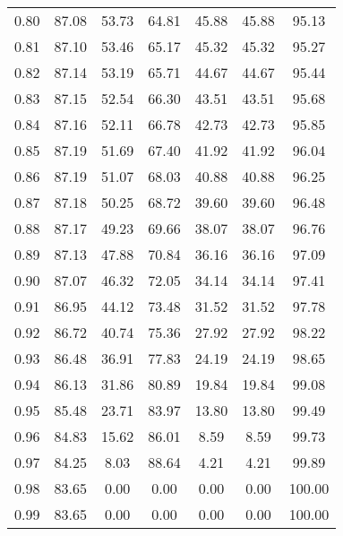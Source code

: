 \begin{tabular}{|c|c|c|c|c|c|c|}
      0.80 &     87.08 &     53.73 &      64.81 &   45.88 &      45.88 &         95.13 \\
      0.81 &     87.10 &     53.46 &      65.17 &   45.32 &      45.32 &         95.27 \\
      0.82 &     87.14 &     53.19 &      65.71 &   44.67 &      44.67 &         95.44 \\
      0.83 &     87.15 &     52.54 &      66.30 &   43.51 &      43.51 &         95.68 \\
      0.84 &     87.16 &     52.11 &      66.78 &   42.73 &      42.73 &         95.85 \\
      0.85 &     87.19 &     51.69 &      67.40 &   41.92 &      41.92 &         96.04 \\
      0.86 &     87.19 &     51.07 &      68.03 &   40.88 &      40.88 &         96.25 \\
      0.87 &     87.18 &     50.25 &      68.72 &   39.60 &      39.60 &         96.48 \\
      0.88 &     87.17 &     49.23 &      69.66 &   38.07 &      38.07 &         96.76 \\
      0.89 &     87.13 &     47.88 &      70.84 &   36.16 &      36.16 &         97.09 \\
      0.90 &     87.07 &     46.32 &      72.05 &   34.14 &      34.14 &         97.41 \\
      0.91 &     86.95 &     44.12 &      73.48 &   31.52 &      31.52 &         97.78 \\
      0.92 &     86.72 &     40.74 &      75.36 &   27.92 &      27.92 &         98.22 \\
      0.93 &     86.48 &     36.91 &      77.83 &   24.19 &      24.19 &         98.65 \\
      0.94 &     86.13 &     31.86 &      80.89 &   19.84 &      19.84 &         99.08 \\
      0.95 &     85.48 &     23.71 &      83.97 &   13.80 &      13.80 &         99.49 \\
      0.96 &     84.83 &     15.62 &      86.01 &    8.59 &       8.59 &         99.73 \\
      0.97 &     84.25 &      8.03 &      88.64 &    4.21 &       4.21 &         99.89 \\
      0.98 &     83.65 &      0.00 &       0.00 &    0.00 &       0.00 &        100.00 \\
      0.99 &     83.65 &      0.00 &       0.00 &    0.00 &       0.00 &        100.00 \\
\bottomrule
\end{tabular}
